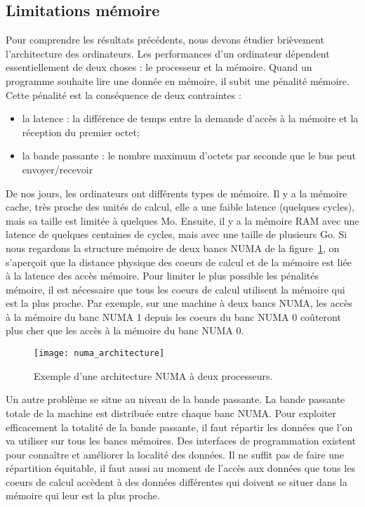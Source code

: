 \subsection{Limitations mémoire}
Pour comprendre les résultats précédents, nous devons étudier brièvement l'architecture des ordinateurs.
%
Les performances d'un ordinateur dépendent essentiellement de deux choses : le processeur et la mémoire.
%
Quand un programme souhaite lire une donnée en mémoire, il subit une pénalité mémoire.
%
Cette pénalité est la conséquence de deux contraintes :
\begin{itemize}
        \item la latence : la différence de temps entre la demande d'accès à la mémoire et la réception du premier octet;
        \item la bande passante : le nombre maximum d'octets par seconde que le bus peut envoyer/recevoir
\end{itemize}
%
De nos jours, les ordinateurs ont différents types de mémoire.
%
Il y a la mémoire cache, très proche des unités de calcul, elle a une faible latence (quelques cycles), mais sa taille est limitée à quelques Mo.
%
Ensuite, il y a la mémoire RAM avec une latence de quelques centaines de cycles, mais avec une taille de plusieurs Go.
%
Si nous regardons la structure mémoire de deux bancs NUMA de la figure~\ref{fig:numa_architecture}, on s'aperçoit que la distance physique des coeurs de calcul et de la mémoire est liée à la latence des accès mémoire.
%
Pour limiter le plus possible les pénalités mémoire, il est nécessaire que tous les coeurs de calcul utilisent la mémoire qui est la plus proche.
%
Par exemple, sur une machine à deux bancs NUMA, les accès à la mémoire du banc NUMA 1 depuis les coeurs du banc NUMA 0 coûteront plus cher que les accès à la mémoire du banc NUMA 0.
\begin{figure}
  \centering
  \texttt{[image: numa\_architecture]}
  \caption{Exemple d'une architecture NUMA à deux processeurs.}
  \label{fig:numa_architecture}
\end{figure}
Un autre problème se situe au niveau de la bande passante.
%
La bande passante totale de la machine est distribuée entre chaque banc NUMA.
%
Pour exploiter efficacement la totalité de la bande passante, il faut répartir les données que l'on va utiliser sur tous les bancs mémoires.
%
Des interfaces de programmation existent pour connaître et améliorer la localité des données.
%
Il ne suffit pas de faire une répartition équitable, il faut aussi au moment de l'accès aux données que tous les coeurs de calcul accèdent à des données différentes qui doivent se situer dans la mémoire qui leur est la plus proche.
